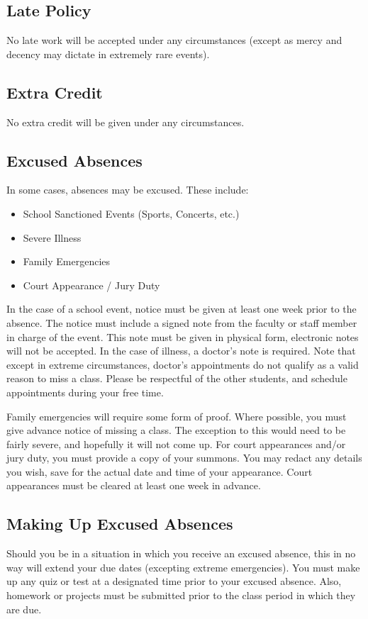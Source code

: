 \documentclass[11pt]{article}
\begin{document}
\subsection*{Late Policy}
No late work will be accepted under any circumstances (except as mercy
and decency may dictate in extremely rare events).

\subsection*{Extra Credit}
No extra credit will be given under any circumstances.

\subsection*{Excused Absences}
In some cases, absences may be excused. These include:
\begin{itemize}
    \item School Sanctioned Events (Sports, Concerts, etc.)
    \item Severe Illness
    \item Family Emergencies
    \item Court Appearance / Jury Duty
\end{itemize}
In the case of a school event, notice must be given at least one week
prior to the absence. The notice must include a signed note from the
faculty or staff member in charge of the event. This note must be
given in physical form, electronic notes will not be accepted.
In the case of illness, a doctor's note is required. Note that
except in extreme circumstances, doctor's appointments do not qualify as a valid reason to miss
a class. Please be respectful of the other students, and schedule
appointments during your free time.

Family emergencies will require some form of proof. Where possible,
you must give advance notice of missing a class. The exception to this
would need to be fairly severe, and hopefully it will not come up.
For court appearances and/or jury duty, you must provide a copy of
your summons. You may redact any details you wish, save for the
actual date and time of your appearance. Court appearances must be
cleared at least one week in advance.

\subsection*{Making Up Excused Absences}
Should you be in a situation in which you receive an excused absence,
this in no way will extend your due dates (excepting extreme
emergencies). You must make up any quiz or test at a designated time 
prior to your excused absence. Also, homework or projects must
be submitted prior to the class period in which they are due.
\end{document}
